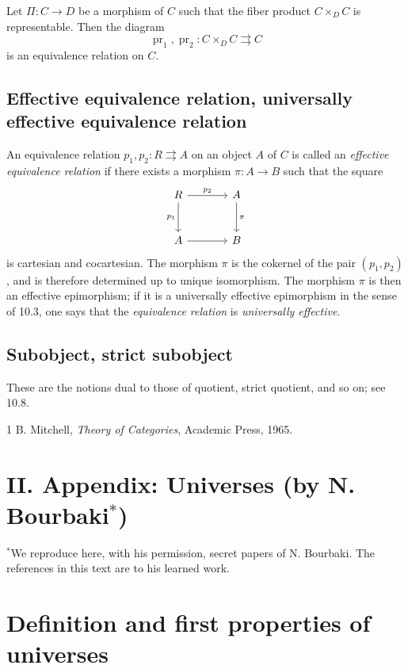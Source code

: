 \documentclass[11pt]{article}
\newcommand{\pr}{\operatorname{pr}}
\begin{document}
Let \(\Pi:C\to D\) be a morphism of \(C\) such that the fiber product \(C\times_D C\) is representable. Then the diagram
\[
 \pr_1,\pr_2:C\times_D C\rightrightarrows C
\]
is an equivalence relation on \(C\).

\subsection{Effective equivalence relation, universally effective equivalence relation}

An equivalence relation \(p_1,p_2:R\rightrightarrows A\) on an object \(A\) of \(C\) is called an \emph{effective equivalence relation} if there exists a morphism \(\pi:A\to B\) such that the square
\[
\begin{tikzcd}[column sep=large,row sep=large]
R \arrow[r,"p_2"] \arrow[d,"p_1"'] & A \arrow[d,"\pi"] \\
A \arrow[r] & B
\end{tikzcd}
\]
is cartesian and cocartesian. The morphism \(\pi\) is the cokernel of the pair \((p_1,p_2)\), and is therefore determined up to unique isomorphism. The morphism \(\pi\) is then an effective epimorphism; if it is a universally effective epimorphism in the sense of 10.3, one says that the \emph{equivalence relation} is \emph{universally effective}.

\subsection{Subobject, strict subobject}

These are the notions dual to those of quotient, strict quotient, and so on; see 10.8.

\begin{thebibliography}{1}
 B. Mitchell, \emph{Theory of Categories}, Academic Press, 1965.
\end{thebibliography}

\newpage

\section*{II. Appendix: Universes (by N. Bourbaki\texorpdfstring{\(^*\)}{*})}

\noindent\(^*\)We reproduce here, with his permission, secret papers of N. Bourbaki. The references in this text are to his learned work.

\setcounter{section}{0}
\section{Definition and first properties of universes}
\end{document}
